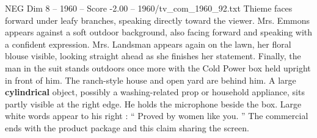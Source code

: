 \begin{textsample}{NEG Dim 8 – 1960 – Score -2.00 – 1960/tv\_com\_1960\_92.txt}
Thieme faces forward under leafy branches, speaking directly toward the viewer.
Mrs.
Emmons appears against a soft outdoor background, also facing forward and speaking with a confident expression.
Mrs.
Landsman appears again on the lawn, her floral blouse visible, looking straight ahead as she finishes her statement.
Finally, the man in the suit stands outdoors once more with the Cold Power box held upright in front of him.
The ranch-style house and open yard are behind him.
A large \textbf{cylindrical} object, possibly a washing-related prop or household appliance, sits partly visible at the right edge.
He holds the microphone beside the box.
Large white words appear to his right : “ Proved by women like you. ” The commercial ends with the product package and this claim sharing the screen.

\end{textsample}
